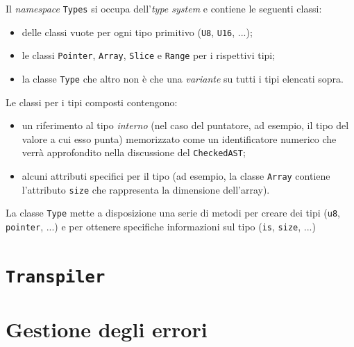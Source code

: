 Il \textit{namespace} \texttt{Types} si occupa dell'\emph{type system} e contiene le seguenti classi:
\begin{itemize}
	\item delle classi vuote per ogni tipo primitivo (\texttt{U8}, \texttt{U16}, ...);
	\item le classi \texttt{Pointer}, \texttt{Array}, \texttt{Slice} e \texttt{Range} per i rispettivi tipi;
	\item la classe \texttt{Type} che altro non \`e che una \textit{variante} su tutti i tipi elencati sopra.
\end{itemize}
Le classi per i tipi composti contengono:
\begin{itemize}
	\item un riferimento al tipo \textit{interno} (nel caso del puntatore, ad esempio, il tipo del valore a cui esso punta) memorizzato come un identificatore numerico che verr\`a approfondito nella discussione del \texttt{CheckedAST};
	\item alcuni attributi specifici per il tipo (ad esempio, la classe \texttt{Array} contiene l'attributo \texttt{size} che rappresenta la dimensione dell'array).
\end{itemize}
La classe \texttt{Type} mette a disposizione una serie di metodi per creare dei tipi (\texttt{u8}, \texttt{pointer}, ...) e per ottenere specifiche informazioni sul tipo (\texttt{is}, \texttt{size}, ...)

\section{\texttt{Transpiler}}
\label{sec:transpiler}

\section{Gestione degli errori}
\label{sec:gestione-degli-errori}
